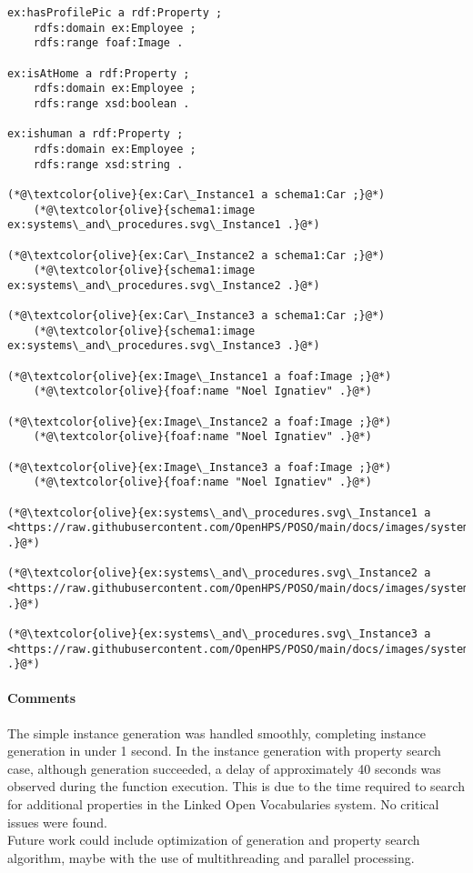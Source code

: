 \begin{lstlisting}[caption={Result Test Case 1.2}, label={lst:three-rdf-instances-extended}]
ex:hasProfilePic a rdf:Property ;
    rdfs:domain ex:Employee ;
    rdfs:range foaf:Image .

ex:isAtHome a rdf:Property ;
    rdfs:domain ex:Employee ;
    rdfs:range xsd:boolean .

ex:ishuman a rdf:Property ;
    rdfs:domain ex:Employee ;
    rdfs:range xsd:string .

(*@\textcolor{olive}{ex:Car\_Instance1 a schema1:Car ;}@*)
    (*@\textcolor{olive}{schema1:image ex:systems\_and\_procedures.svg\_Instance1 .}@*)

(*@\textcolor{olive}{ex:Car\_Instance2 a schema1:Car ;}@*)
    (*@\textcolor{olive}{schema1:image ex:systems\_and\_procedures.svg\_Instance2 .}@*)

(*@\textcolor{olive}{ex:Car\_Instance3 a schema1:Car ;}@*)
    (*@\textcolor{olive}{schema1:image ex:systems\_and\_procedures.svg\_Instance3 .}@*)

(*@\textcolor{olive}{ex:Image\_Instance1 a foaf:Image ;}@*)
    (*@\textcolor{olive}{foaf:name "Noel Ignatiev" .}@*)

(*@\textcolor{olive}{ex:Image\_Instance2 a foaf:Image ;}@*)
    (*@\textcolor{olive}{foaf:name "Noel Ignatiev" .}@*)

(*@\textcolor{olive}{ex:Image\_Instance3 a foaf:Image ;}@*)
    (*@\textcolor{olive}{foaf:name "Noel Ignatiev" .}@*)

(*@\textcolor{olive}{ex:systems\_and\_procedures.svg\_Instance1 a <https://raw.githubusercontent.com/OpenHPS/POSO/main/docs/images/systems\_and\_procedures.svg> .}@*)

(*@\textcolor{olive}{ex:systems\_and\_procedures.svg\_Instance2 a <https://raw.githubusercontent.com/OpenHPS/POSO/main/docs/images/systems\_and\_procedures.svg> .}@*)

(*@\textcolor{olive}{ex:systems\_and\_procedures.svg\_Instance3 a <https://raw.githubusercontent.com/OpenHPS/POSO/main/docs/images/systems\_and\_procedures.svg> .}@*)
\end{lstlisting}

\paragraph{Comments}
The simple instance generation was handled smoothly, completing instance generation in under 1 second.  
In the instance generation with property search case, although generation succeeded, a delay of approximately 40 seconds was observed during the function execution.
This is due to the time required to search for additional properties in the Linked Open Vocabularies system.  
No critical issues were found. 
\\
Future work could include optimization of generation and property search algorithm, maybe with the use of multithreading and parallel processing.

